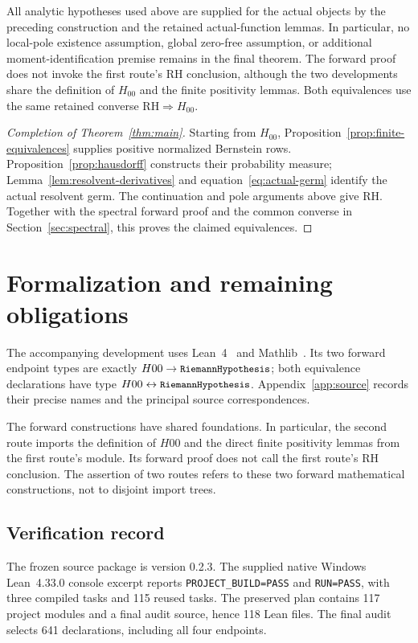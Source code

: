 \documentclass[11pt,a4paper]{article}
\theoremstyle{definition}
\numberwithin{equation}{section}
\newcommand{\RH}{\mathrm{RH}}
\newcommand{\code}[1]{\texttt{\small #1}}
\begin{document}
All analytic hypotheses used above are supplied for the actual objects by the preceding construction and the retained actual-function lemmas. In particular, no local-pole existence assumption, global zero-free assumption, or additional moment-identification premise remains in the final theorem. The forward proof does not invoke the first route's RH conclusion, although the two developments share the definition of $H_{00}$ and the finite positivity lemmas. Both equivalences use the same retained converse $\mathrm{RH}\Rightarrow H_{00}$.

\begin{proof}[Completion of Theorem~\ref{thm:main}]
Starting from $H_{00}$, Proposition~\ref{prop:finite-equivalences} supplies positive normalized Bernstein rows. Proposition~\ref{prop:hausdorff} constructs their probability measure; Lemma~\ref{lem:resolvent-derivatives} and equation~\eqref{eq:actual-germ} identify the actual resolvent germ. The continuation and pole arguments above give $\RH$. Together with the spectral forward proof and the common converse in Section~\ref{sec:spectral}, this proves the claimed equivalences.
\end{proof}

\section{Formalization and remaining obligations}\label{sec:formal}
The accompanying development uses Lean~4~\cite{lean4} and
Mathlib~\cite{mathlib}. Its two forward endpoint types are exactly
$H00\to\code{RiemannHypothesis}$; both equivalence declarations have
type $H00\leftrightarrow\code{RiemannHypothesis}$. Appendix~\ref{app:source}
records their precise names and the principal source correspondences.

The forward constructions have shared foundations. In particular, the
second route imports the definition of $H00$ and the direct finite
positivity lemmas from the first route's module. Its forward proof does
not call the first route's RH conclusion. The assertion of two routes
refers to these two forward mathematical constructions, not to disjoint
import trees.

\subsection{Verification record}
The frozen source package is version 0.2.3. The supplied native Windows
Lean~4.33.0 console excerpt reports
\code{PROJECT\_BUILD=PASS} and \code{RUN=PASS}, with three compiled
tasks and 115 reused tasks. The preserved plan contains 117 project
modules and a final audit source, hence 118 Lean files. The final audit
selects 641 declarations, including all four endpoints.
\end{document}
